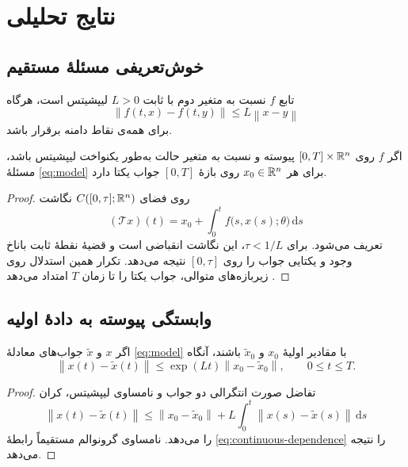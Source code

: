 \chapter{نتایج تحلیلی}
\label{chap2}

\section{خوش‌تعریفی مسئلهٔ مستقیم}

\begin{definition}
تابع $f$ نسبت به متغیر دوم با ثابت $L>0$ لیپشیتس است، هرگاه
\begin{equation}
  \left\lVert f(t,x)-f(t,y)\right\rVert
  \leq L\left\lVert x-y\right\rVert
\end{equation}
برای همه‌ی نقاط دامنه برقرار باشد.
\end{definition}

\begin{theorem}
اگر $f$ روی $[0,T]\times\mathbb{R}^n$ پیوسته و نسبت به متغیر حالت به‌طور یکنواخت لیپشیتس باشد، مسئلهٔ \eqref{eq:model} برای هر $x_0\in\mathbb{R}^n$ روی بازهٔ $[0,T]$ جواب یکتا دارد.
\label{thm:existence-uniqueness}
\end{theorem}

\begin{proof}
روی فضای $C([0,\tau];\mathbb{R}^n)$ نگاشت
\[
  (\mathcal{T}x)(t)=x_0+\int_0^t f\bigl(s,x(s);\theta\bigr)\,\mathrm{d}s
\]
تعریف می‌شود. برای $\tau<1/L$، این نگاشت انقباضی است و قضیهٔ نقطهٔ ثابت باناخ وجود و یکتایی جواب را روی $[0,\tau]$ نتیجه می‌دهد. تکرار همین استدلال روی زیر‌بازه‌های متوالی، جواب یکتا را تا زمان $T$ امتداد می‌دهد \cite{bs04}.
\end{proof}

\section{وابستگی پیوسته به دادهٔ اولیه}

\begin{proposition}
اگر $x$ و $\widetilde{x}$ جواب‌های معادلهٔ \eqref{eq:model} با مقادیر اولیهٔ $x_0$ و $\widetilde{x}_0$ باشند، آنگاه
\begin{equation}
  \left\lVert x(t)-\widetilde{x}(t)\right\rVert
  \leq \exp(Lt)\left\lVert x_0-\widetilde{x}_0\right\rVert,
  \qquad 0\leq t\leq T.
  \label{eq:continuous-dependence}
\end{equation}
\end{proposition}

\begin{proof}
تفاضل صورت انتگرالی دو جواب و نامساوی لیپشیتس، کران
\[
  \left\lVert x(t)-\widetilde{x}(t)\right\rVert
  \leq \left\lVert x_0-\widetilde{x}_0\right\rVert
  +L\int_0^t\left\lVert x(s)-\widetilde{x}(s)\right\rVert\,\mathrm{d}s
\]
را می‌دهد. نامساوی گرونوالم مستقیماً رابطهٔ \eqref{eq:continuous-dependence} را نتیجه می‌دهد.
\end{proof}

